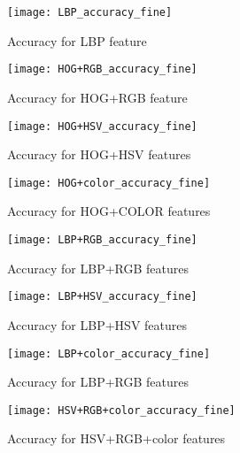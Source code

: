 \FloatBarrier
\begin{figure}[!h]
	\begin{minipage}[b]{0.4\textwidth}
		\texttt{[image: LBP\_accuracy\_fine]}
		\caption{Accuracy for LBP feature}
	\end{minipage}
	\hfill
	\begin{minipage}[b]{0.4\textwidth}
		\texttt{[image: HOG+RGB\_accuracy\_fine]}
		\caption{Accuracy for HOG+RGB feature}
	\end{minipage}
\end{figure}
\FloatBarrier

\FloatBarrier
\begin{figure}[!h]
	\begin{minipage}[b]{0.4\textwidth}
		\texttt{[image: HOG+HSV\_accuracy\_fine]}
		\caption{Accuracy for HOG+HSV features}
	\end{minipage}
	\hfill
	\begin{minipage}[b]{0.4\textwidth}
		\texttt{[image: HOG+color\_accuracy\_fine]}
		\caption{Accuracy for HOG+COLOR features}
	\end{minipage}
\end{figure}
\FloatBarrier


\FloatBarrier
\begin{figure}[!h]
	\begin{minipage}[b]{0.4\textwidth}
		\texttt{[image: LBP+RGB\_accuracy\_fine]}
		\caption{Accuracy for LBP+RGB features}
	\end{minipage}
	\hfill
	\begin{minipage}[b]{0.4\textwidth}
		\texttt{[image: LBP+HSV\_accuracy\_fine]}
		\caption{Accuracy for LBP+HSV features}
	\end{minipage}
\end{figure}
\FloatBarrier

\FloatBarrier
\begin{figure}[!h]
	\begin{minipage}[b]{0.4\textwidth}
		\texttt{[image: LBP+color\_accuracy\_fine]}
		\caption{Accuracy for LBP+RGB features}
	\end{minipage}
	\hfill
	\begin{minipage}[b]{0.4\textwidth}
		\texttt{[image: HSV+RGB+color\_accuracy\_fine]}
		\caption{Accuracy for HSV+RGB+color features}
	\end{minipage}
\end{figure}
\FloatBarrier